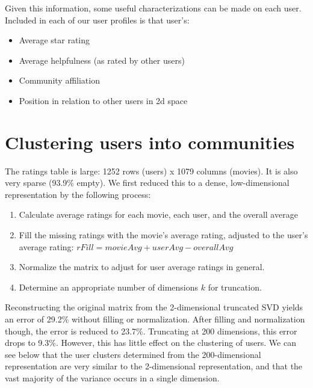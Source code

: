 \documentclass[11pt]{article}
\begin{document}
Given this information, some useful characterizations can be made on each user. Included in each of our user profiles is that user's:

\begin{itemize}
    \item Average star rating
    \item Average helpfulness (as rated by other users)
    \item Community affiliation
    \item Position in relation to other users in 2d space
\end{itemize}


\section{Clustering users into communities}

The ratings table is large: 1252 rows (users) x 1079 columns (movies). It is also very sparse (93.9\% empty). We first reduced this to a dense, low-dimensional representation by the following process:

\begin{enumerate}
    \item Calculate average ratings for each movie, each user, and the overall average
    \item Fill the missing ratings with the movie's average rating, adjusted to the user's average rating: $rFill = movieAvg + userAvg - overallAvg$
    \item Normalize the matrix to adjust for user average ratings in general.
    \item Determine an appropriate number of dimensions $k$ for truncation.
\end{enumerate}

Reconstructing the original matrix from the 2-dimensional truncated SVD yields an error of 29.2\% without filling or normalization. After filling and normalization though, the error is reduced to 23.7\%. Truncating at 200 dimensions, this error drops to 9.3\%. However, this has little effect on the clustering of users. We can see below that the user clusters determined from the 200-dimensional representation are very similar to the 2-dimensional representation, and that the vast majority of the variance occurs in a single dimension.
\end{document}
